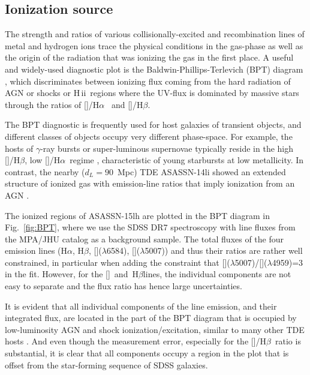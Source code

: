 \documentclass[traditabstract]{aa}
\newcommand{\hb}{H$\beta$}
\newcommand{\ha}{H$\alpha$}
\newcommand{\hii}{\mbox{H\,{\sc ii}}}
\newcommand{\oiii}{[\ion{O}{iii}]}
\newcommand{\nii}{[\ion{N}{ii}]}
\begin{document}
\subsection{Ionization source}
\label{sec:ionsource}

The strength and ratios of various collisionally-excited and recombination lines of metal and hydrogen ions trace the physical conditions in the gas-phase as well as the origin of the radiation that was ionizing the gas in the first place. A useful and widely-used diagnostic plot is the Baldwin-Phillips-Terlevich (BPT) diagram \citep{1981PASP...93....5B}, which discriminates between ionizing flux coming from the hard radiation of AGN or shocks or \hii~regions where the UV-flux is dominated by massive stars through the ratios of \nii/\ha~ and \oiii/\hb.

The BPT diagnostic is frequently used for host galaxies of transient objects, and different classes of objects occupy very different phase-space. For example, the hosts of $\gamma$-ray bursts or super-luminous supernovae typically reside in the high \oiii/\hb, low \nii/\ha~regime \citep{2015A&A...581A.125K, 2015MNRAS.449..917L}, characteristic of young starbursts at low metallicity. In contrast, the nearby ($d_L=90$~Mpc) TDE ASASSN-14li \citep{2016MNRAS.455.2918H} showed an extended structure of ionized gas with emission-line ratios that imply ionization from an AGN \citep{2016ApJ...830L..32P}.

The ionized regions of ASASSN-15lh are plotted in the BPT diagram in Fig.~\ref{fig:BPT}, where we use the SDSS DR7 spectroscopy \citep{2009ApJS..182..543A} with line fluxes from the MPA/JHU catalog as a background sample. The total fluxes of the four emission lines (\ha, \hb, \nii($\lambda$6584), \oiii($\lambda$5007)) and thus their ratios are rather well constrained, in particular when adding the constraint that \oiii($\lambda$5007)/\oiii($\lambda$4959)=3 in the fit. However, for the \oiii~and~\hb lines, the individual components are not easy to separate and the flux ratio has hence large uncertainties.

It is evident that all individual components of the line emission, and their integrated flux, are located in the part of the BPT diagram that is occupied by low-luminosity AGN and shock ionization/excitation, similar to many other TDE hosts \citep{2017ApJ...835..176F}. And even though the measurement error, especially for the \oiii/\hb\ ratio is substantial, it is clear that all components occupy a region in the plot that is offset from the star-forming sequence of SDSS galaxies.
\end{document}
